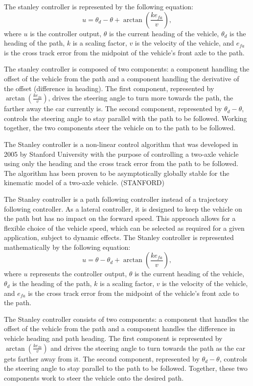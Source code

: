 \documentclass[arbeit=studie,oneside,BCOR=12mm]{ArbeitRST}
\begin{document}
The stanley controller is represented by the following equation: $$u = \theta_d
- \theta + \arctan\left(\frac{ke_{fa}}{v}\right),$$ where $u$ is the controller
output, $\theta$ is the current heading of the vehicle, $\theta_d$ is the
heading of the path, $k$ is a scaling factor, $v$ is the velocity of the
vehicle, and $e_{fa}$ is the cross track error from the midpoint of the
vehicle’s front axle to the path. 

The stanley controller is composed of two components:  a component handling the
offset of the vehicle from the path and a component handling the derivative of
the offset (difference in heading).  The first component, represented by
$\arctan(\frac{ke_{fa}}{v})$,  drives the steering angle to turn more towards
the path, the farther away the car currently is. The second component,
represented by $\theta_d - \theta$, controls the steering angle to stay
parallel with the path to be followed. Working together, the two components
steer the vehicle on to the path to be followed.

\fi

The Stanley controller is a non-linear control algorithm that was developed in
2005 by Stanford University with the purpose of controlling a two-axle vehicle
using only the heading and the cross track error from the path to be followed.
The algorithm has been proven to be asymptotically globally stable for the
kinematic model of a two-axle vehicle. (STANFORD)

The Stanley controller is a path following controller instead of a trajectory
following controller. As a lateral controller, it is designed to keep the
vehicle on the path but has no impact on the forward speed. This approach
allows for a flexible choice of the vehicle speed, which can be selected as
required for a given application, subject to dynamic effects. The Stanley
controller is represented mathematically by the following equation: 
\begin{equation} 
    u = \theta - \theta_d + \arctan\left(\frac{ke_{fa}}{v}\right), 
    \label{eq:Stanley-Regler} 
\end{equation}
where $u$ represents the controller output, $\theta$ is the current heading of
the vehicle, $\theta_d$ is the heading of the path, $k$ is a scaling factor,
$v$ is the velocity of the vehicle, and $e_{fa}$ is the cross track error from
the midpoint of the vehicle's front axle to the path.

The Stanley controller consists of two components: a component that handles the
offset of the vehicle from the path and a component handles the difference in
vehicle heading and path heading. The first component is represented by
$\arctan(\frac{ke_{fa}}{v})$ and drives the steering angle to turn towards the
path as the car gets farther away from it. The second component, represented by
$\theta_d - \theta$, controls the steering angle to stay parallel to the path
to be followed. Together, these two components work to steer the vehicle onto
the desired path.
\end{document}
